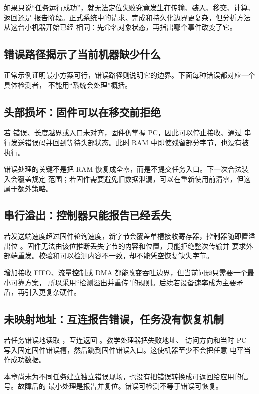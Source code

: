 如果只说“任务运行成功”，就无法定位失败究竟发生在传输、装入、移交、计算、返回还是
报告阶段。正式系统中的请求、完成和持久化边界更复杂，但分析方法从这台小机器开始已经
相同：先命名对象状态，再指出哪个事件改变了它。

\subsection{错误路径揭示了当前机器缺少什么}

正常示例证明最小方案可行，错误路径则说明它的边界。下面每种错误都对应一个具体检测者，
不能用“系统会处理”概括。

\subsection{头部损坏：固件可以在移交前拒绝}

若  错误、长度越界或入口未对齐，固件仍掌握 PC，因此可以停止接收、通过
串行发送错误码并回到等待头部状态。此时 RAM 中即使残留部分字节，也没有被执行。

错误处理的关键不是把 RAM 恢复成全零，而是不提交任务入口。下一次合法装入会覆盖规定
范围；若固件需要避免旧数据泄漏，可以在重新使用前清零，但这属于额外策略。

\subsection{串行溢出：控制器只能报告已经丢失}

若发送端速度超过固件轮询速度，新字节会覆盖单槽接收寄存器，控制器随即置溢出位
。固件无法由该位推断丢失字节的内容和位置，只能拒绝整次传输并
要求外部端重发。校验和可以检测内容不一致，却不能凭空恢复缺失字节。

增加接收 FIFO、流量控制或 DMA 都能改变吞吐边界，但当前问题只需要一个最小可靠方案，
所以采用“检测溢出并重传”的规则。后续若设备速率成为主要矛盾，再引入更复杂硬件。

\subsection{未映射地址：互连报告错误，任务没有恢复机制}

若任务错误地读取 ，互连返回 。教学处理器把失败地址、
访问方向和当时 PC 写入固定固件错误槽，然后跳到固件错误入口。这使机器至少不会把任意
电平当作成功数据。

本章尚未为不同任务建立独立错误现场，也没有把错误转换成可返回给应用的信号。故障后的
最小处理是报告并复位。错误可检测不等于错误可恢复。

